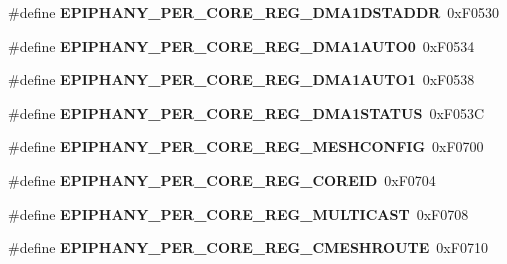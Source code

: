\begin{DoxyCompactItemize}
\item 
\mbox{\label{epiphany-utility_8h_a4cc25af9efa7483102c6c879b4d7dfa6}} 
\#define {\bfseries E\+P\+I\+P\+H\+A\+N\+Y\+\_\+\+P\+E\+R\+\_\+\+C\+O\+R\+E\+\_\+\+R\+E\+G\+\_\+\+D\+M\+A1\+D\+S\+T\+A\+D\+DR}~0x\+F0530
\item 
\mbox{\label{epiphany-utility_8h_ae48a76d637dbba9b0fdf301ba3710260}} 
\#define {\bfseries E\+P\+I\+P\+H\+A\+N\+Y\+\_\+\+P\+E\+R\+\_\+\+C\+O\+R\+E\+\_\+\+R\+E\+G\+\_\+\+D\+M\+A1\+A\+U\+T\+O0}~0x\+F0534
\item 
\mbox{\label{epiphany-utility_8h_a461db7640a7a2537bad438f42dffc36c}} 
\#define {\bfseries E\+P\+I\+P\+H\+A\+N\+Y\+\_\+\+P\+E\+R\+\_\+\+C\+O\+R\+E\+\_\+\+R\+E\+G\+\_\+\+D\+M\+A1\+A\+U\+T\+O1}~0x\+F0538
\item 
\mbox{\label{epiphany-utility_8h_afc06aad44f4faf9b8365fcfff9cdbdf9}} 
\#define {\bfseries E\+P\+I\+P\+H\+A\+N\+Y\+\_\+\+P\+E\+R\+\_\+\+C\+O\+R\+E\+\_\+\+R\+E\+G\+\_\+\+D\+M\+A1\+S\+T\+A\+T\+US}~0x\+F053C
\item 
\mbox{\label{epiphany-utility_8h_ae14794cb84d2a692ada6d4027dd6f550}} 
\#define {\bfseries E\+P\+I\+P\+H\+A\+N\+Y\+\_\+\+P\+E\+R\+\_\+\+C\+O\+R\+E\+\_\+\+R\+E\+G\+\_\+\+M\+E\+S\+H\+C\+O\+N\+F\+IG}~0x\+F0700
\item 
\mbox{\label{epiphany-utility_8h_a34c364900b72041bff282dad70133d48}} 
\#define {\bfseries E\+P\+I\+P\+H\+A\+N\+Y\+\_\+\+P\+E\+R\+\_\+\+C\+O\+R\+E\+\_\+\+R\+E\+G\+\_\+\+C\+O\+R\+E\+ID}~0x\+F0704
\item 
\mbox{\label{epiphany-utility_8h_ab300020967db2935c63b426d09097aa1}} 
\#define {\bfseries E\+P\+I\+P\+H\+A\+N\+Y\+\_\+\+P\+E\+R\+\_\+\+C\+O\+R\+E\+\_\+\+R\+E\+G\+\_\+\+M\+U\+L\+T\+I\+C\+A\+ST}~0x\+F0708
\item 
\mbox{\label{epiphany-utility_8h_a9c4460a8c3f361d27017423974ea8ed5}} 
\#define {\bfseries E\+P\+I\+P\+H\+A\+N\+Y\+\_\+\+P\+E\+R\+\_\+\+C\+O\+R\+E\+\_\+\+R\+E\+G\+\_\+\+C\+M\+E\+S\+H\+R\+O\+U\+TE}~0x\+F0710
\item 
\mbox{\label{epiphany-utility_8h_ae2f6b3c5d86b66d9345d7b4dcad0e679}} 

\end{DoxyCompactItemize}
